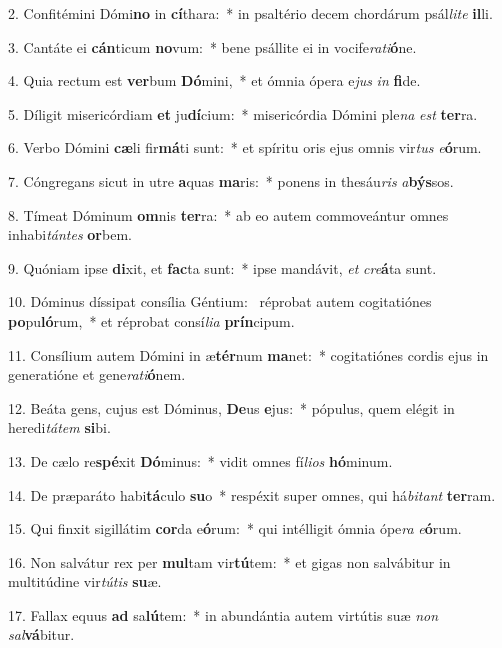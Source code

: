 2. Confitémini Dómi\textbf{no} in \textbf{cí}thara:~*  in psaltério decem chordárum psál\textit{li}\textit{te} \textbf{il}li.\

3. Cantáte ei \textbf{cán}ticum \textbf{no}vum:~*  bene psállite ei in vocife\textit{ra}\textit{ti}\textbf{ó}ne.\

4. Quia rectum est \textbf{ver}bum \textbf{Dó}mini,~*  et ómnia ópera e\textit{jus} \textit{in} \textbf{fi}de.\

5. Díligit misericórdiam \textbf{et} ju\textbf{dí}cium:~*  misericórdia Dómini ple\textit{na} \textit{est} \textbf{ter}ra.\

6. Verbo Dómini \textbf{cæ}li fir\textbf{má}ti sunt:~*  et spíritu oris ejus omnis vir\textit{tus} \textit{e}\textbf{ó}rum.\

7. Cóngregans sicut in utre \textbf{a}quas \textbf{ma}ris:~*  ponens in thesáu\textit{ris} \textit{a}\textbf{býs}sos.\

8. Tímeat Dóminum \textbf{om}nis \textbf{ter}ra:~*  ab eo autem commoveántur omnes inhabi\textit{tán}\textit{tes} \textbf{or}bem.\

9. Quóniam ipse \textbf{di}xit, et \textbf{fac}ta sunt:~*  ipse mandávit, \textit{et} \textit{cre}\textbf{á}ta sunt.\

10. Dóminus díssipat consília Géntium: \dag\  réprobat autem cogitatiónes \textbf{po}pu\textbf{ló}rum,~*  et réprobat consí\textit{li}\textit{a} \textbf{prín}cipum.\

11. Consílium autem Dómini in æ\textbf{tér}num \textbf{ma}net:~*  cogitatiónes cordis ejus in generatióne et gene\textit{ra}\textit{ti}\textbf{ó}nem.\

12. Beáta gens, cujus est Dóminus, \textbf{De}us \textbf{e}jus:~*  pópulus, quem elégit in heredi\textit{tá}\textit{tem} \textbf{si}bi.\

13. De cælo re\textbf{spé}xit \textbf{Dó}minus:~*  vidit omnes fí\textit{li}\textit{os} \textbf{hó}minum.\

14. De præparáto habi\textbf{tá}culo \textbf{su}o~*  respéxit super omnes, qui há\textit{bi}\textit{tant} \textbf{ter}ram.\

15. Qui finxit sigillátim \textbf{cor}da e\textbf{ó}rum:~*  qui intélligit ómnia ópe\textit{ra} \textit{e}\textbf{ó}rum.\

16. Non salvátur rex per \textbf{mul}tam vir\textbf{tú}tem:~*  et gigas non salvábitur in multitúdine vir\textit{tú}\textit{tis} \textbf{su}æ.\

17. Fallax equus \textbf{ad} sa\textbf{lú}tem:~*  in abundántia autem virtútis suæ \textit{non} \textit{sal}\textbf{vá}bitur.\

